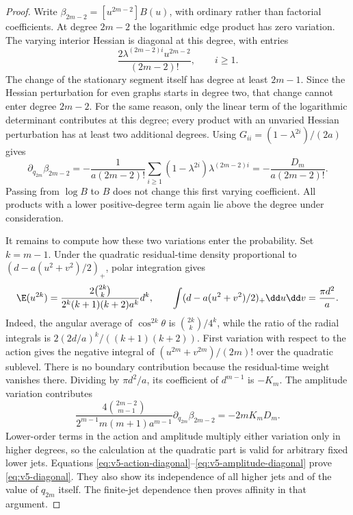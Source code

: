 \begin{proof}
Write $\beta_{2m-2}=[u^{2m-2}]B(u)$, with ordinary rather than factorial
coefficients. At degree $2m-2$ the logarithmic edge product has zero
variation. The varying interior Hessian is diagonal at this degree, with
entries
\[
 \frac{2\lambda^{(2m-2)i}u^{2m-2}}{(2m-2)!},\qquad i\ge1.
\]
The change of the stationary segment itself has degree at least $2m-1$.
Since the Hessian perturbation for even graphs starts in degree two,
that change cannot enter degree $2m-2$. For the same reason, only the
linear term of the logarithmic determinant contributes at this degree;
every product with an unvaried Hessian perturbation has at least two
additional degrees. Using $G_{ii}=(1-\lambda^{2i})/(2a)$ gives
\begin{equation}\label{eq:v5-amplitude-diagonal}
 \partial_{q_{2m}}\beta_{2m-2}
 =-\frac1{a(2m-2)!}
    \sum_{i\ge1}(1-\lambda^{2i})\lambda^{(2m-2)i}
 =-\frac{D_m}{a(2m-2)!}.
\end{equation}
Passing from $\log B$ to $B$ does not change this first varying
coefficient. All products with a lower positive-degree term again lie
above the degree under consideration.

It remains to compute how these two variations enter the probability.
Set $k=m-1$. Under the quadratic residual-time density proportional to
$(d-a(u^2+v^2)/2)_+$, polar integration gives
\begin{equation}\label{eq:v5-moments}
 \E(u^{2k})=
 \frac{2\binom{2k}{k}}{2^k(k+1)(k+2)a^k}d^k,
 \qquad
 \int(d-a(u^2+v^2)/2)_+\dd u\dd v=\frac{\pi d^2}{a}.
\end{equation}
Indeed, the angular average of $\cos^{2k}\theta$ is
$\binom{2k}{k}/4^k$, while the ratio of the radial integrals is
$2(2d/a)^k/((k+1)(k+2))$.
First variation with respect to the action gives the negative integral
of $(u^{2m}+v^{2m})/(2m)!$ over the quadratic sublevel. There is no
boundary contribution because the residual-time weight vanishes there.
Dividing by $\pi d^2/a$, its coefficient of $d^{m-1}$ is $-K_m$.
The amplitude variation contributes
\[
 \frac{4\binom{2m-2}{m-1}}{2^{m-1}m(m+1)a^{m-1}}
                  \partial_{q_{2m}}\beta_{2m-2}=-2mK_mD_m.
\]
Lower-order terms in the action and amplitude multiply either variation
only in higher degrees, so the calculation at the quadratic part is
valid for arbitrary fixed lower jets. Equations
\eqref{eq:v5-action-diagonal}--\eqref{eq:v5-amplitude-diagonal} prove
\eqref{eq:v5-diagonal}. They also show its independence of all higher
jets and of the value of $q_{2m}$ itself. The finite-jet dependence then
proves affinity in that argument.


\end{proof}
